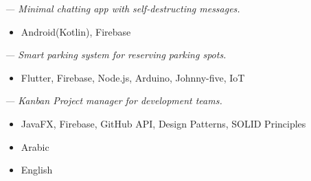 \smallskip
\smallskip
{} \textit{— Minimal chatting app with self-destructing messages.}
\begin{itemize}
\item Android(Kotlin), Firebase
\end{itemize}
\smallskip
\smallskip
{} \textit{— Smart parking system for reserving parking spots.}
\begin{itemize}
\item Flutter, Firebase, Node.js, Arduino, Johnny-five, IoT
\end{itemize}
\smallskip
\smallskip
{} \textit{— Kanban Project manager for development teams.}
\begin{itemize}
\item JavaFX, Firebase, GitHub API, Design Patterns, SOLID Principles
\end{itemize}

\begin{itemize}
\item Arabic
\item English
\end{itemize}